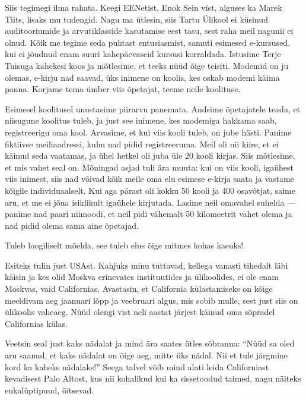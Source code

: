 Siis tegimegi ilma rahata. Keegi EENetist, Enok Sein vist, alguses ka Marek Tiits, lisaks mu 
tudengid. Nagu ma ütlesin, siis Tartu Ülikool ei küsinud 
auditooriumide ja arvutiklasside kasutamise eest tasu, sest raha meil nagunii ei olnud. 
Kõik me tegime seda puhtast entusiasmist, samuti esimesed e-kursused, kui ei jõudnud enam suuri kahepäevaseid kursusi 
korraldada. Istusime Terje Tuisuga kahekesi 
koos ja mõtlesime, et teeks nüüd õige teisiti. Modemid on ju olemas, 
e-kirju nad saavad, üks inimene on koolis, kes oskab modemi käima panna. 
Korjame tema ümber viis õpetajat, teeme neile koolituse. 

Esimesel koolitusel unustasime piirarvu panemata. Andsime õpetajatele teada, et niisugune koolitus 
tuleb, ja just see inimene, kes modemiga hakkama saab, 
registreerigu oma kool. Arvasime, et kui viis kooli tuleb, on jube 
hästi. Panime fiktiivse meiliaadressi, kuhu nad pidid registreeruma. Meil oli nii kiire, et ei käinud seda vaatamas, ja ühel hetkel 
oli juba üle 20 kooli kirjas. Siis mõtlesime, et 
mis vahet seal on. Mõningad asjad tuli ära muuta: kui on viis 
kooli, igaühest viis inimest, siis nad võivad kõik meile oma elu esimese 
e-kirja saata ja vastame kõigile individuaalselt. Kui aga pärast oli kokku 50 kooli 
ja 400 osavõtjat, saime aru, et me ei jõua isiklikult igaühele 
kirjutada. Lasime neil omavahel suhelda --- panime nad 
paari niimoodi, et neil pidi vähemalt 50 kilomeetrit vahet olema ja nad pidid olema sama aine 
õpetajad.


Tuleb loogiliselt mõelda, see tuleb elus õige mitmes 
kohas kasuks! 


Esiteks tulin just USAst. Kahjuks minu tuttavad, 
kellega vanasti tihedalt läbi käisin ja kes olid Moskva erinevates 
instituutides ja ülikoolides, ei ole enam Moskvas, vaid Californias. Avastasin, et California külastamiseks on kõige meeldivam aeg 
jaanuari lõpp ja veebruari algus, mis sobib mulle, sest just siis on ülikoolis 
vaheaeg. Nüüd olengi vist neli aastat järjest käinud oma sõpradel Californias külas. 

Veetsin seal just kaks nädalat 
ja mind ära saates ütles sõbranna: \enquote{Nüüd sa oled aru saanud, et kaks 
nädalat on õige aeg, mitte üks nädal. Nii et tule järgmine kord ka kaheks 
nädalaks!} Seega talvel võib mind alati leida 
Californiast kevadisest Palo Altost, kus nii kohalikud kui ka 
sissetoodud taimed, nagu näiteks eukalüptipuud, õitsevad. 

